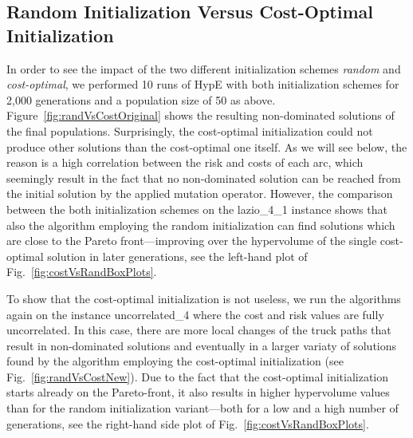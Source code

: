 \documentclass[preprint,12pt]{elsarticle}
\begin{document}
\subsection{Random Initialization Versus Cost-Optimal Initialization}
In order to see the impact of the two different initialization schemes \emph{random} and \emph{cost-optimal}, we performed 10 runs of HypE with both initialization schemes for 2,000 generations and a population size of 50 as above. Figure~\ref{fig:randVsCostOriginal} shows the resulting non-dominated solutions of the final populations. Surprisingly, the cost-optimal initialization could not produce other solutions than the cost-optimal one itself. As we will see below, the reason is a high correlation between the risk and costs of each arc, which seemingly result in the fact that no non-dominated solution can be reached from the initial solution by the applied mutation operator. However, the comparison between the both initialization schemes on the lazio\_4\_1 instance shows that also the algorithm employing the random initialization can find solutions which are close to the Pareto front---improving over the hypervolume of the single cost-optimal solution in later generations, see the left-hand plot of Fig.~\ref{fig:costVsRandBoxPlots}. 

To show that the cost-optimal initialization is not useless, we run the algorithms again on the instance uncorrelated\_4 where the cost and risk values are fully uncorrelated. In this case, there are more local changes of the truck paths that result in non-dominated solutions and eventually in a larger variaty of solutions found by the algorithm employing the cost-optimal initialization (see Fig.~\ref{fig:randVsCostNew}). Due to the fact that the cost-optimal initialization starts already on the Pareto-front, it also results in higher hypervolume values than for the random initialization variant---both for a low and a high number of generations, see the right-hand side plot of Fig.~\ref{fig:costVsRandBoxPlots}.
\end{document}

